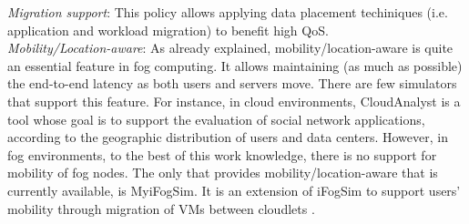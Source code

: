 \noindent\tab \textit{Migration support}: This policy allows applying data placement techiniques (i.e. application and workload migration) to benefit high QoS.\\
\noindent\tab \textit{Mobility/Location-aware}: As already explained, mobility/location-aware is quite an essential feature in fog computing. It allows maintaining (as much as possible) the end-to-end latency as both users and servers move. There are few simulators that support this feature. For instance, in cloud environments, CloudAnalyst \cite{wickremasinghe2010cloudanalyst} is a tool whose goal is to support the evaluation of social network applications, according to the geographic distribution of users and data centers. However, in fog environments, to the best of this work knowledge, there is no support for mobility of fog nodes. The only that provides mobility/location-aware that is currently available, is MyiFogSim. It is an extension of iFogSim to support users' mobility through migration of VMs between cloudlets \cite{lopes2017myifogsim}.\\
